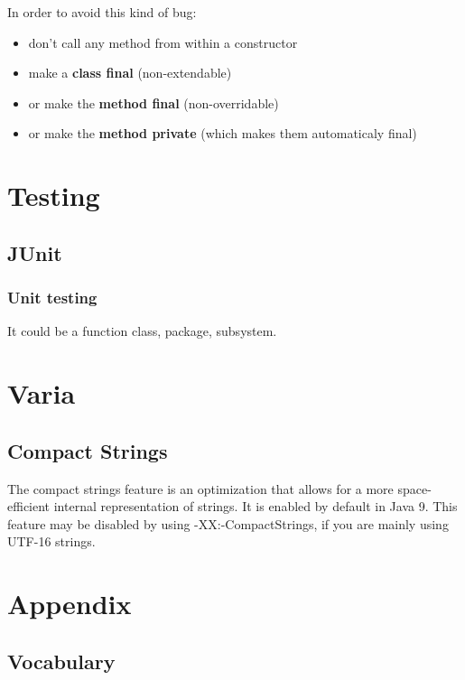 \documentclass{report}
\begin{document}
In order to avoid this kind of bug:
\begin{itemize}
	\item don't call any method from within a constructor
	\item make a \textbf{class final }(non-extendable)
	\item or make the \textbf{method final} (non-overridable)
	\item or make the \textbf{method private} (which makes them automaticaly final)
\end{itemize}




\part{Testing}



\chapter{JUnit}


\section{Unit testing}
It could be a function class, package, subsystem.




\part{Varia}



\chapter{Compact Strings}
The compact strings feature is an optimization that allows for a more space-efficient internal representation of strings. It is enabled by default in Java 9. This feature may be disabled by using -XX:-CompactStrings, if you are mainly using UTF-16 strings.




\part{Appendix}



\chapter{Vocabulary}
\end{document}
